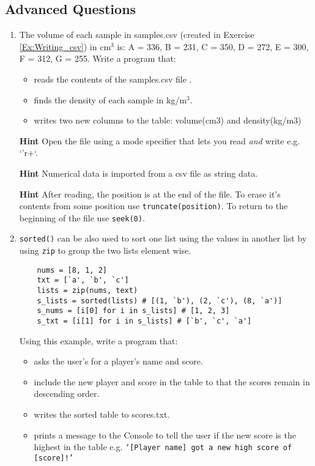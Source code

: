 \documentclass[11pt]{report}
\begin{document}
\subsection*{Advanced Questions}







\begin{enumerate}[label=(\Alph*)]
    
    \item  The volume of each sample in samples.csv (created in Exercise \ref{Ex:Writing_csv}) in cm$^3$ is: A = 336, B = 231, C = 350, D = 272, E = 300, F = 312, G = 255. Write a program that:
    {\begin{itemize}
        \item reads the contents of the samples.csv file .
        \item finds the density of each sample in kg/m$^3$.
        \item writes two new columns to the table: volume(cm3) and density(kg/m3)
    \end{itemize}} 
    
    {\bf Hint} Open the file using a mode specifier that lets you read {\it and} write e.g. `'r+`.
    
    {\bf Hint} Numerical data is imported from a  csv file as string data.
    
    {\bf Hint} After reading, the position is at the end of the file. To erase it's contents from some position use {\tt truncate(position)}. To return to the beginning of the file use {\tt seek(0)}. 
    
    \item {\tt sorted()} can be also used to sort one list using the values in another list by using {\tt zip} to group the two lists element wise.
    \vspace{0.5 em}
    \begin{verbatim}
    nums = [8, 1, 2]
    txt = [`a', `b', `c']
    lists = zip(nums, text) 
    s_lists = sorted(lists) # [(1, `b'), (2, `c'), (8, `a')]
    s_nums = [i[0] for i in s_lists] # [1, 2, 3]
    s_txt = [i[1] for i in s_lists] # [`b', `c', `a']
    \end{verbatim}

    Using this example, write a program that:
    \begin{itemize}
        \item asks the user's for a player's name and score.
        \item include the new player and score in the table to that the scores remain in descending order.
        \item writes the sorted table to scores.txt.
        \item prints a message to the Console to tell the user if the new score is the highest in the table e.g. {\tt `[Player name] got a new high score of [score]!'} 
    \end{itemize}
    
    
    
    
    
 
    
\end{enumerate}
\end{document}
